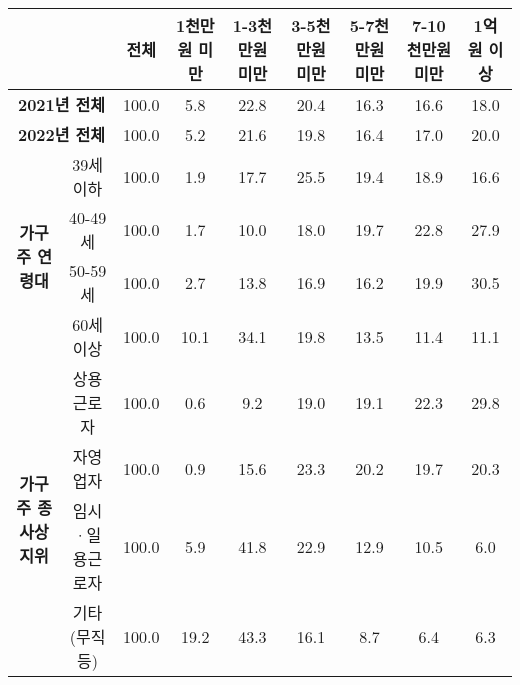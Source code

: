 \begin{tabular}{c|c|c|c|c|c|c|c|c}
\toprule
\multicolumn{2}{c|}{} &\textbf{전체} & \textbf{1천만원 미만} & \textbf{1-3천만원 미만} & \textbf{3-5천만원 미만} & \textbf{5-7천만원 미만} & \textbf{7-10천만원 미만} & \textbf{1억원 이상} \\ \midrule
\multicolumn{2}{c|}{\textbf{2021년 전체}} & 100.0 & 5.8 & 22.8 & 20.4 & 16.3 & 16.6 & 18.0 \\ \hline
\multicolumn{2}{c|}{\textbf{2022년 전체}} & 100.0 & 5.2 & 21.6 & 19.8 & 16.4 & 17.0 & 20.0 \\ \hline
\multirow{4}{*}{\textbf{가구주 연령대}} & 39세 이하 & 100.0 & 1.9 & 17.7 & 25.5 & 19.4 & 18.9 & 16.6 \\ \cline{3-9}
 & 40-49세 & 100.0 & 1.7 & 10.0 & 18.0 & 19.7 & 22.8 & \cellcolor{myblue}27.9 \\ \cline{3-9}
 & 50-59세 & 100.0 & 2.7 & 13.8 & 16.9 & 16.2 & 19.9 & \cellcolor{myblue}30.5 \\ \cline{3-9}
 & 60세 이상 & 100.0 & \cellcolor{myblue}10.1 & 34.1 & 19.8 & 13.5 & 11.4 & 11.1 \\ \hline
\multirow{4}{*}{\textbf{가구주 종사상 지위}} & 상용근로자 & 100.0 & 0.6 & 9.2 & 19.0 & 19.1 & 22.3 & 29.8 \\ \cline{3-9}
 & 자영업자 & 100.0 & 0.9 & 15.6 & 23.3 & 20.2 & 19.7 & 20.3 \\ \cline{3-9}
 & 임시·일용근로자 & 100.0 & 5.9 & 41.8 & 22.9 & 12.9 & 10.5 & 6.0 \\ \cline{3-9}
 & 기타(무직 등) & 100.0 & 19.2 & 43.3 & 16.1 & 8.7 & 6.4 & 6.3 \\ \bottomrule
\end{tabular}